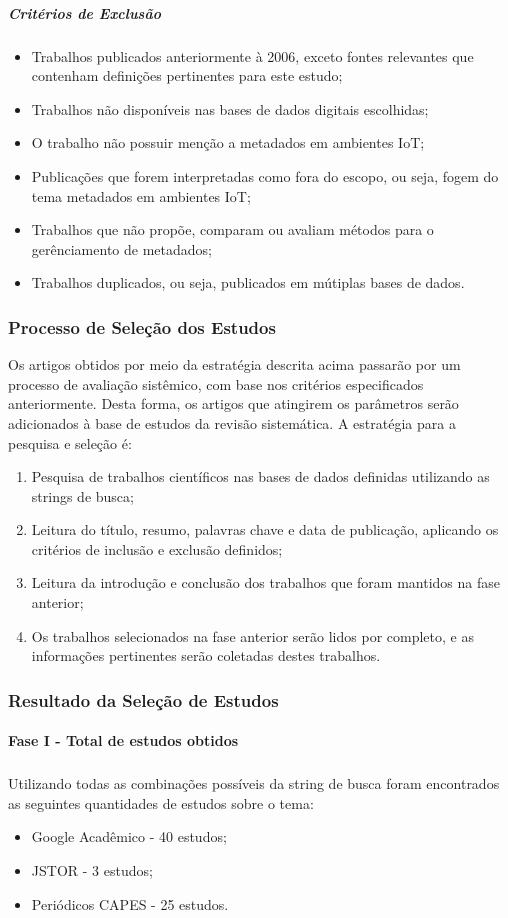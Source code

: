 \subparagraph{Critérios de Exclusão}
\begin{itemize}
  \item Trabalhos publicados anteriormente à 2006, exceto fontes relevantes que contenham definições pertinentes para este estudo;
  \item Trabalhos não disponíveis nas bases de dados digitais escolhidas;
  \item O trabalho não possuir menção a metadados em ambientes \acrlong{IoT};
  \item Publicações que forem interpretadas como fora do escopo, ou seja, fogem do tema metadados em ambientes \acrshort{IoT};
  \item Trabalhos que não propõe, comparam ou avaliam métodos para o gerênciamento de metadados;
  \item Trabalhos duplicados, ou seja, publicados em mútiplas bases de dados.
\end{itemize}

\subsubsection{Processo de Seleção dos Estudos}
\quad Os artigos obtidos por meio da estratégia descrita acima passarão por um processo de avaliação sistêmico, com base nos critérios especificados anteriormente.
Desta forma, os artigos que atingirem os parâmetros serão adicionados à base de estudos da revisão sistemática. A estratégia para a pesquisa e seleção é:
\begin{enumerate}
  \item Pesquisa de trabalhos científicos nas bases de dados definidas utilizando as strings de busca;
  \item Leitura do título, resumo, palavras chave e data de publicação, aplicando os critérios de inclusão e exclusão definidos;
  \item Leitura da introdução e conclusão dos trabalhos que foram mantidos na fase anterior;
  \item Os trabalhos selecionados na fase anterior serão lidos por completo, e as informações pertinentes serão coletadas destes trabalhos.
\end{enumerate}

\subsubsection{Resultado da Seleção de Estudos}
\paragraph{Fase I - Total de estudos obtidos}
\subparagraph{}
\quad Utilizando todas as combinações possíveis da string de busca foram encontrados as seguintes quantidades de estudos sobre o tema:
\begin{itemize}
  \item Google Acadêmico - 40 estudos;
  \item JSTOR - 3 estudos;
  \item Periódicos CAPES - 25 estudos.
\end{itemize}
